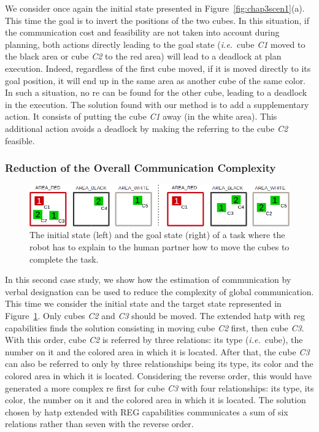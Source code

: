\documentclass[a4paper,11pt,twoside]{StyleThese}
\begin{document}
We consider once again the initial state presented in Figure~\ref{fig:chap3scen1}(a). This time the goal is to invert the positions of the two cubes. In this situation, if the communication cost and feasibility are not taken into account during planning, both actions directly leading to the goal state (\textit{i.e.}~cube \textit{C1} moved to the black area or cube \textit{C2} to the red area) will lead to a deadlock at plan execution. Indeed, regardless of the first cube moved, if it is moved directly to its goal position, it will end up in the same area as another cube of the same color. In such a situation, no \acrshort{re} can be found for the other cube, leading to a deadlock in the execution.
The solution found with our method is to add a supplementary action. It consists of putting the cube \textit{C1} away (in the white area). This additional action avoids a deadlock by making the referring to the cube \textit{C2} feasible.

\subsubsection{Reduction of the Overall Communication Complexity}

\begin{figure}[t!]
\centering
\includegraphics[width=\textwidth]{figures/chapter3/setup2.png}
\caption{\label{fig:case2} The initial state (left) and the goal state (right) of a task where the robot has to explain to the human partner how to move the cubes to complete the task. }
\end{figure}

In this second case study, we show how the estimation of communication by verbal designation can be used to reduce the complexity of global communication. This time we consider the initial state and the target state represented in Figure~\ref{fig:case2}. Only cubes \textit{C2} and \textit{C3} should be moved. The extended \acrshort{hatp} with \acrshort{reg} capabilities finds the solution consisting in moving cube \textit{C2} first, then cube \textit{C3}. With this order, cube \textit{C2} is referred by three relations: its type (\textit{i.e.}~cube), the number on it and the colored area in which it is located. After that, the cube \textit{C3} can also be referred to only by three relationships being its type, its color and the colored area in which it is located. Considering the reverse order, this would have generated a more complex \acrshort{re} first for cube \textit{C3} with four relationships: its type, its color, the number on it and the colored area in which it is located.
The solution chosen by \acrshort{hatp} extended with REG capabilities communicates a sum of six relations rather than seven with the reverse order.
\end{document}
